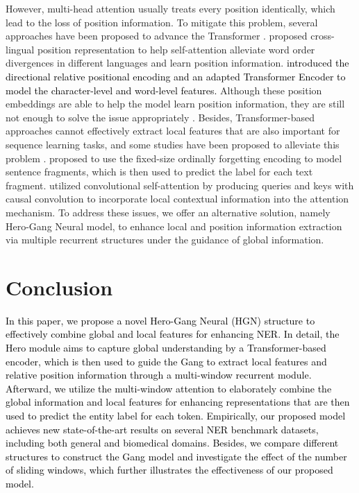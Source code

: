 \documentclass[11pt]{article}
\begin{document}
However, multi-head attention usually treats every position identically, which lead to the loss of position information.
To mitigate this problem, several approaches have been proposed to advance the Transformer \cite{dai2019transformer,shaw2018self,yan2019tener}.
\citet{shaw2018self} proposed cross-lingual position representation to help self-attention alleviate word order divergences in different languages and learn position information.
\textcolor{black}{
\citet{yan2019tener} introduced the directional relative positional encoding and an adapted Transformer Encoder to model the character-level and word-level features.
}
Although these position embeddings are able to help the model learn position information, they are still not enough to solve the issue appropriately \cite{Rtransformer, huang2020improve,qu2021explore}.
Besides, Transformer-based approaches cannot effectively extract local features that are also important for sequence learning tasks, and some studies have been proposed to alleviate this problem \cite{xu2017local,li2019enhancing,yang2019convolutional}.
\citet{xu2017local} proposed to use the fixed-size ordinally forgetting encoding to model sentence fragments, which is then used to predict the label for each text fragment.
\citet{li2019enhancing} utilized convolutional self-attention by producing queries and keys with causal convolution to incorporate local contextual information into the attention mechanism.
To address these issues, we offer an alternative solution, namely Hero-Gang Neural model, to enhance local and position information extraction via multiple recurrent structures under the guidance of global information.


\section{Conclusion}
\textcolor{black}{
In this paper, we propose a novel Hero-Gang {N}eural (HGN) structure to effectively combine global and local features for enhancing NER.
In detail, the Hero module aims to capture global understanding by a Transformer-based encoder, which is then used to guide the Gang to extract local features and relative position information through a multi-window recurrent module.
Afterward, we utilize the multi-window attention to elaborately combine the global information and local features for enhancing representations that are then used to predict the entity label for each token.
Empirically, our proposed model achieves new state-of-the-art results on several NER benchmark datasets, including both general and biomedical domains.
Besides, we compare different structures to construct the Gang model and investigate the effect of the number of sliding windows, which further illustrates the effectiveness of our proposed model.
}
\end{document}
